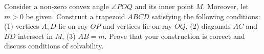 Consider a non-zero convex angle $\angle POQ$ and its inner point $M$. Moreover, let $m>0$ be given. Construct a trapezoid $ABCD$ satisfying the following conditions:
(1) vertices $A, D$ lie on ray $OP$ and vertices lie on ray $OQ$,
(2) diagonals $AC$ and $BD$ intersect in $M$,
(3) $AB=m$.
Prove that your construction is correct and discuss conditions of solvability.